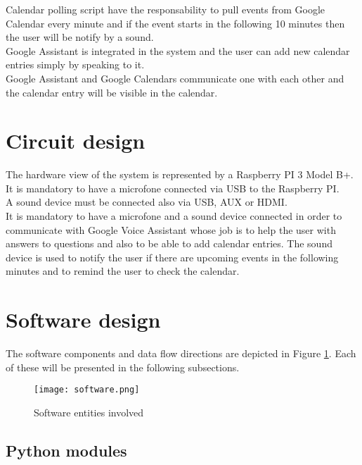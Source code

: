 \documentclass[a4paper,11pt]{article}
\begin{document}
Calendar polling script have the responsability to pull events from Google Calendar every minute and if the event starts in the following 10 minutes then the user will be notify by a sound.\\

Google Assistant is integrated in the system and the user can add new calendar entries simply by speaking to it.\\

Google Assistant and Google Calendars communicate one with each other and the calendar entry will be visible in the calendar.\\

\section{Circuit design}

The hardware view of the system is represented by a Raspberry PI 3 Model B+.\\

It is mandatory to have a microfone connected via USB to the Raspberry PI.\\

A sound device must be connected also via USB, AUX or HDMI.\\

It is mandatory to have a microfone and a sound device connected in order to communicate with Google Voice Assistant whose job is to help the user with answers to questions and also to be able to add calendar entries. The sound device is used to notify the user if there are upcoming events in the following minutes and to remind the user to check the calendar.

\section{Software design}

The software components and data flow directions are depicted in Figure \ref{fig:software}. Each of these will be presented in the following subsections.\\

\begin{figure}[h]
\centering
\texttt{[image: software.png]}
\caption{Software entities involved}
\label{fig:software}
\end{figure}
 
\subsection{Python modules}
\end{document}
